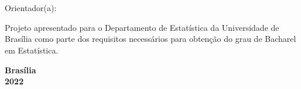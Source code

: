 \thispagestyle{empty}

\begin{center}
\textbf{\autor} \\
\vspace{5cm}
\textbf{\titulo} \\
\vspace{3cm}
\small
Orientador(a): \orientador \\
\end{center}


\vspace*{3cm}

\begin{flushright}
\begin{minipage}{7.5cm}
 \parbox[t]{7.5cm}{Projeto apresentado para o Departamento de Estatística da Universidade de Brasília como parte dos requisitos necessários para obtenção do grau de Bacharel em Estatística.}
\end{minipage}
\end{flushright}

\vspace{5cm}

\begin{center}
{\bf{Brasília} \\ }
\bf{2022}
\end{center}
